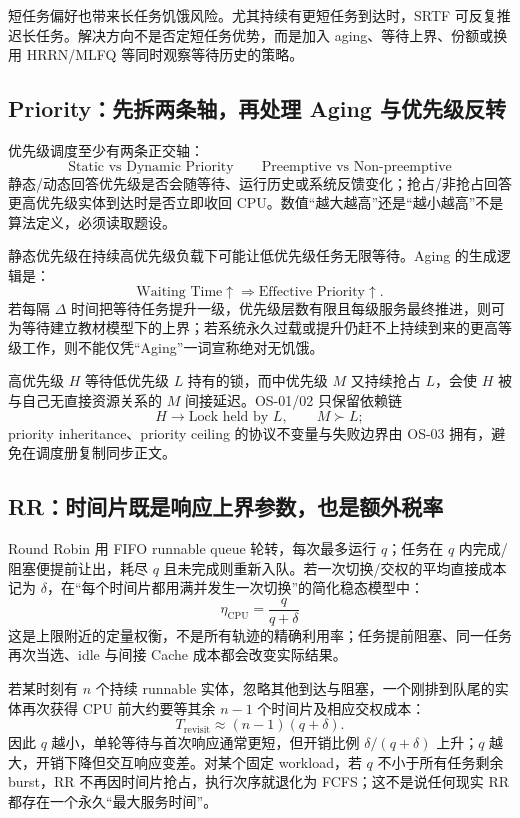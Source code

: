 \documentclass[11pt,a4paper]{ctexart}
\begin{document}
短任务偏好也带来长任务饥饿风险。尤其持续有更短任务到达时，SRTF 可反复推迟长任务。解决方向不是否定短任务优势，而是加入 aging、等待上界、份额或换用 HRRN/MLFQ 等同时观察等待历史的策略。

\subsection{Priority：先拆两条轴，再处理 Aging 与优先级反转}

优先级调度至少有两条正交轴：
\[
\boxed{\text{Static vs Dynamic Priority}}\qquad
\boxed{\text{Preemptive vs Non-preemptive}}
\]
静态/动态回答优先级是否会随等待、运行历史或系统反馈变化；抢占/非抢占回答更高优先级实体到达时是否立即收回 CPU。数值“越大越高”还是“越小越高”不是算法定义，必须读取题设。

静态优先级在持续高优先级负载下可能让低优先级任务无限等待。Aging 的生成逻辑是：
\[
\text{Waiting Time}\uparrow\Longrightarrow\text{Effective Priority}\uparrow.
\]
若每隔 $\Delta$ 时间把等待任务提升一级，优先级层数有限且每级服务最终推进，则可为等待建立教材模型下的上界；若系统永久过载或提升仍赶不上持续到来的更高等级工作，则不能仅凭“Aging”一词宣称绝对无饥饿。

\begin{warn}
高优先级 $H$ 等待低优先级 $L$ 持有的锁，而中优先级 $M$ 又持续抢占 $L$，会使 $H$ 被与自己无直接资源关系的 $M$ 间接延迟。OS-01/02 只保留依赖链
\[
H\to\text{Lock held by }L,\qquad M\succ L;
\]
priority inheritance、priority ceiling 的协议不变量与失败边界由 OS-03 拥有，避免在调度册复制同步正文。
\end{warn}

\subsection{RR：时间片既是响应上界参数，也是额外税率}

Round Robin 用 FIFO runnable queue 轮转，每次最多运行 $q$；任务在 $q$ 内完成/阻塞便提前让出，耗尽 $q$ 且未完成则重新入队。若一次切换/交权的平均直接成本记为 $\delta$，在“每个时间片都用满并发生一次切换”的简化稳态模型中：
\[
\boxed{\eta_{\text{CPU}}=\frac{q}{q+\delta}}
\]
这是上限附近的定量权衡，不是所有轨迹的精确利用率；任务提前阻塞、同一任务再次当选、idle 与间接 Cache 成本都会改变实际结果。

若某时刻有 $n$ 个持续 runnable 实体，忽略其他到达与阻塞，一个刚排到队尾的实体再次获得 CPU 前大约要等其余 $n-1$ 个时间片及相应交权成本：
\[
T_{\text{revisit}}\approx(n-1)(q+\delta).
\]
因此 $q$ 越小，单轮等待与首次响应通常更短，但开销比例 $\delta/(q+\delta)$ 上升；$q$ 越大，开销下降但交互响应变差。对某个固定 workload，若 $q$ 不小于所有任务剩余 burst，RR 不再因时间片抢占，执行次序就退化为 FCFS；这不是说任何现实 RR 都存在一个永久“最大服务时间”。
\end{document}
